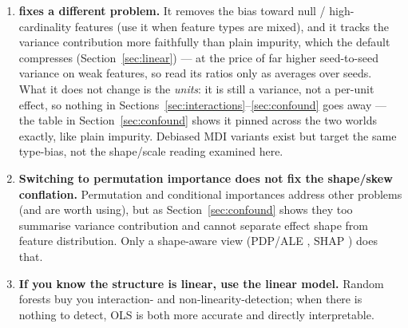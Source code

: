 \begin{enumerate}[leftmargin=1.6em]
  \emph{With one caveat.} A PDP averages the model over the marginal
  distribution of the other features, which is exact here because our features
  are independent. When features are dependent it evaluates the model on
  combinations that do not occur in the data, and \citet{hooker2021} show that
  the resulting curve can report the model's
  extrapolation rather than any effect --- the same mechanism that inflates
  permutation importance for correlated predictors. On correlated data, use
  ALE \citep{apley2020}, which accumulates local effects conditional on the
  neighbouring feature distribution instead of marginalising across it.
\item \textbf{ fixes a different problem.} It removes
  the bias toward null / high-cardinality features (use it when feature types
  are mixed), and it tracks the variance contribution more faithfully than plain
  impurity, which the default  compresses (Section~\ref{sec:linear})
  --- at the price of far higher seed-to-seed variance on weak features, so
  read its ratios only as averages over seeds.
  What it does not change is the \emph{units}: it is still a variance, not a
  per-unit effect, so nothing in
  Sections~\ref{sec:interactions}--\ref{sec:confound} goes away --- the table
  in Section~\ref{sec:confound} shows it pinned across the two worlds exactly,
  like plain impurity. Debiased
  MDI variants exist \citep{li2019,zhou2021} but target the same type-bias, not
  the shape/scale reading examined here.
\item \textbf{Switching to permutation importance does not fix the shape/skew
  conflation.} Permutation and conditional \citep{strobl2008} importances address
  other problems (and are worth using), but as Section~\ref{sec:confound} shows
  they too summarise variance contribution and cannot separate effect shape from
  feature distribution. Only a shape-aware view (PDP/ALE \citep{friedman2001,apley2020},
  SHAP \citep{lundberg2017}) does that.
\item \textbf{If you know the structure is linear, use the linear model.} Random
  forests buy you interaction- and non-linearity-detection; when there is nothing
  to detect, OLS is both more accurate and directly interpretable.
\end{enumerate}
